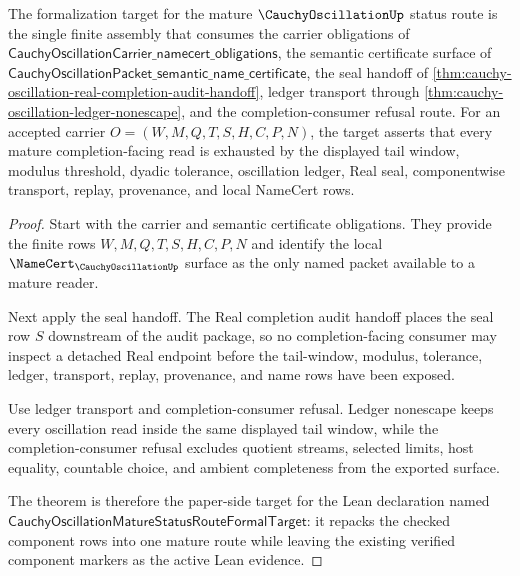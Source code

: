\begin{theorem}
\label{thm:cauchy-oscillation-mature-status-route-formal-target}
The formalization target for the mature $\CauchyOscillationUp$ status route is the single finite assembly that consumes the carrier obligations of $\mathsf{CauchyOscillationCarrier\_namecert\_obligations}$, the semantic certificate surface of $\mathsf{CauchyOscillationPacket\_semantic\_name\_certificate}$, the seal handoff of \autoref{thm:cauchy-oscillation-real-completion-audit-handoff}, ledger transport through \autoref{thm:cauchy-oscillation-ledger-nonescape}, and the completion-consumer refusal route. For an accepted carrier $O=(W,M,Q,T,S,H,C,P,N)$, the target asserts that every mature completion-facing read is exhausted by the displayed tail window, modulus threshold, dyadic tolerance, oscillation ledger, Real seal, componentwise transport, replay, provenance, and local NameCert rows.
\end{theorem}
\begin{proof}
Start with the carrier and semantic certificate obligations. They provide the finite rows $W,M,Q,T,S,H,C,P,N$ and identify the local $\NameCert_{\CauchyOscillationUp}$ surface as the only named packet available to a mature reader.

Next apply the seal handoff. The Real completion audit handoff places the seal row $S$ downstream of the audit package, so no completion-facing consumer may inspect a detached Real endpoint before the tail-window, modulus, tolerance, ledger, transport, replay, provenance, and name rows have been exposed.

Use ledger transport and completion-consumer refusal. Ledger nonescape keeps every oscillation read inside the same displayed tail window, while the completion-consumer refusal excludes quotient streams, selected limits, host equality, countable choice, and ambient completeness from the exported surface.

The theorem is therefore the paper-side target for the Lean declaration named $\mathsf{CauchyOscillationMatureStatusRouteFormalTarget}$: it repacks the checked component rows into one mature route while leaving the existing verified component markers as the active Lean evidence.
\end{proof}
